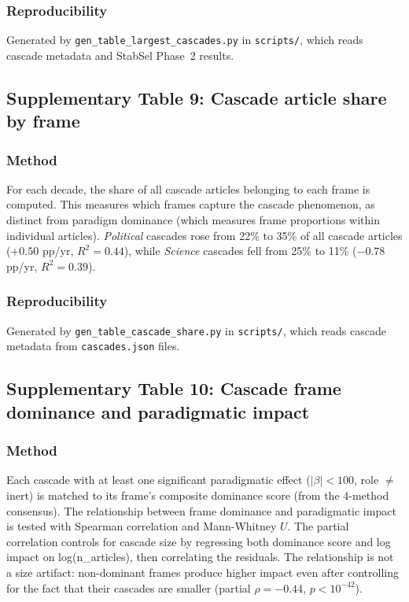 \subsubsection*{Reproducibility}
Generated by \texttt{gen\_table\_largest\_cascades.py} in \texttt{scripts/},
which reads cascade metadata and StabSel Phase~2 results.


\newpage
\subsection*{Supplementary Table 9: Cascade article share by frame}



\subsubsection*{Method}
For each decade, the share of all cascade articles belonging to each frame is computed. This measures which frames capture the cascade phenomenon, as distinct from paradigm dominance (which measures frame proportions within individual articles). \emph{Political} cascades rose from 22\% to 35\% of all cascade articles ($+0.50$ pp/yr, $R^2 = 0.44$), while \emph{Science} cascades fell from 25\% to 11\% ($-0.78$ pp/yr, $R^2 = 0.39$).

\subsubsection*{Reproducibility}
Generated by \texttt{gen\_table\_cascade\_share.py} in \texttt{scripts/},
which reads cascade metadata from \texttt{cascades.json} files.


\newpage
\subsection*{Supplementary Table 10: Cascade frame dominance and paradigmatic impact}



\subsubsection*{Method}
Each cascade with at least one significant paradigmatic effect ($|\beta| < 100$, role $\neq$ inert) is matched to its frame's composite dominance score (from the 4-method consensus). The relationship between frame dominance and paradigmatic impact is tested with Spearman correlation and Mann-Whitney $U$. The partial correlation controls for cascade size by regressing both dominance score and log impact on log(n\_articles), then correlating the residuals. The relationship is not a size artifact: non-dominant frames produce higher impact even after controlling for the fact that their cascades are smaller (partial $\rho = -0.44$, $p < 10^{-42}$).

